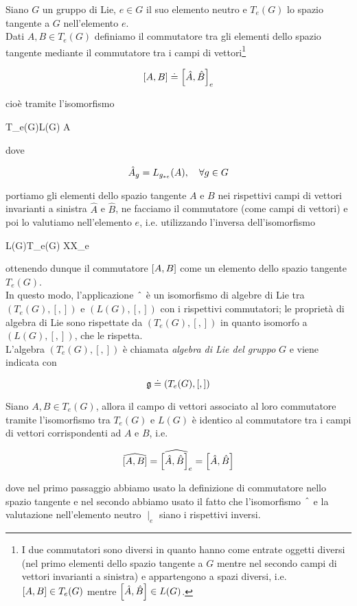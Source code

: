 Siano $ G $ un gruppo di Lie, $ e \in G $ il suo elemento neutro e $ T_{e}(G) $ lo spazio tangente a $ G $ nell'elemento $ e $.\\
Dati $ A,B \in T_{e}(G) $ definiamo il commutatore tra gli elementi dello spazio tangente mediante il commutatore tra i campi di vettori\footnote{%
	I due commutatori sono diversi in quanto hanno come entrate oggetti diversi (nel primo elementi dello spazio tangente a $ G $ mentre nel secondo campi di vettori invarianti a sinistra) e appartengono a spazi diversi, i.e. $ \comm{A}{B} \in T_{e}(G) $ mentre $ \comm{\hat{A}}{\hat{B}} \in L(G) $.%
}

\begin{equation}
	\comm{A}{B} \doteq \comm{\hat{A}}{\hat{B}}_{e}
\end{equation}

cioè tramite l'isomorfismo

\map{\hatapp}%
	{T_{e}(G)}{L(G)}%
	{A}{}
	
dove

\begin{equation}
	\hat{A}_{g} = L_{g_{*e}}(A) \qcomma \forall g \in G
\end{equation}

portiamo gli elementi dello spazio tangente $ A $ e $ B $ nei rispettivi campi di vettori invarianti a sinistra $ \hat{A} $ e $ \hat{B} $, ne facciamo il commutatore (come campi di vettori) e poi lo valutiamo nell'elemento $ e $, i.e. utilizzando l'inversa dell'isomorfismo

%
	{L(G)}{T_{e}(G)}%
	{X}{X_{e}}

ottenendo dunque il commutatore $ \comm{A}{B} $ come un elemento dello spazio tangente $ T_{e}(G) $.\\
In questo modo, l'applicazione $ \; \hat{} \; $ è un isomorfismo di algebre di Lie tra $ (T_{e}(G),[,]) $ e $ (L(G),[,]) $ con i rispettivi commutatori; le proprietà di algebra di Lie sono rispettate da $ (T_{e}(G),[,]) $ in quanto isomorfo a $ (L(G),[,]) $, che le rispetta.\\
L'algebra $ (T_{e}(G),[,]) $ è chiamata \textit{algebra di Lie del gruppo} $ G $ e viene indicata con

\begin{equation}
	\mathfrak{g} \doteq (T_{e}(G),[,])
\end{equation}

\begin{remark}
	Siano $ A,B \in T_{e}(G) $, allora il campo di vettori associato al loro commutatore tramite l'isomorfismo tra $ T_{e}(G) $ e $ L(G) $ è identico al commutatore tra i campi di vettori corrispondenti ad $ A $ e $ B $, i.e.
	
	\begin{equation}
		\widehat{[A,B]} = \widehat{\comm{\hat{A}}{\hat{B}}_{e}} = \comm{\hat{A}}{\hat{B}}
	\end{equation}

	dove nel primo passaggio abbiamo usato la definizione di commutatore nello spazio tangente e nel secondo abbiamo usato il fatto che l'isomorfismo $ \; \hat{} \; $ e la valutazione nell'elemento neutro $ \mid_{e} $ siano i rispettivi inversi.
\end{remark}

